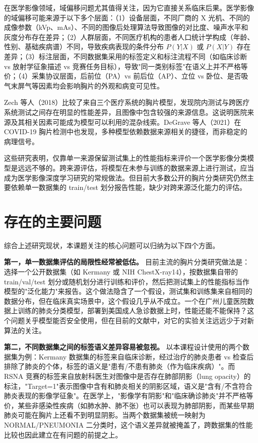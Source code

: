 \documentclass[12pt,a4paper,UTF8,openany]{ctexbook}
\begin{document}
在医学影像领域，域偏移问题尤其值得关注，因为它直接关系临床后果。医学影像的域偏移可能来源于以下多个层面：（1）设备层面，不同厂商的 X 光机、不同的成像参数（kVp、mAs）、不同的图像后处理算法导致图像的对比度、噪声水平和灰度分布存在差异；（2）人群层面，不同医疗机构的患者人口统计学构成（年龄、性别、基础疾病谱）不同，导致疾病表现的条件分布 $P(Y|X)$ 或 $P(X|Y)$ 存在差异；（3）标注层面，不同数据集采用的标签定义和标注流程不同（如临床诊断 vs 放射学征象描述 vs 竞赛任务目标），导致"同一类别标签"在语义上并不严格等价；（4）采集协议层面，后前位（PA）vs 前后位（AP）、立位 vs 卧位、是否吸气末屏气等因素均会影响胸片的外观和病变可见性。

Zech 等人（2018）比较了来自三个医疗系统的胸片模型，发现院内测试与跨医疗系统测试之间存在明显的性能差异，且图像中包含较强的来源信息\cite{zech2018}。这说明医院来源及其相关因素可能成为模型可以利用的混杂线索。DeGrave 等人（2021）在 COVID-19 胸片检测中也发现，多种模型依赖数据来源相关的捷径，而非稳定的病理信号\cite{degrave2021}。

这些研究表明，仅靠单一来源保留测试集上的性能指标来评价一个医学影像分类模型是远远不够的。跨来源评估，将模型在未参与训练的数据来源上进行测试，应当成为医学影像深度学习研究的常规做法。但目前大多数公开的胸片分类研究仍然主要依赖单一数据集的 train/test 划分报告性能，缺少对跨来源泛化能力的评估。

\section{存在的主要问题}

综合上述研究现状，本课题关注的核心问题可以归纳为以下四个方面。

\textbf{第一，单一数据集评估的局限性经常被低估。} 目前主流的胸片分类研究做法是：选择一个公开数据集（如 Kermany 或 NIH ChestX-ray14），按数据集自带的 train/val/test 划分或随机划分进行训练和评价，然后把测试集上的性能指标当作模型的"泛化能力"来报告。这个做法隐含了一个假设，测试集和训练集来自相同的数据分布，但在临床真实场景中，这个假设几乎从不成立。一个在广州儿童医院数据上训练的肺炎分类模型，部署到美国成人急诊数据上时，性能还能不能保持？这个问题关乎模型能否安全使用，但在目前的文献中，对它的实验关注远远少于对新算法的关注。

\textbf{第二，不同数据集之间的标签语义差异容易被忽视。} 以本课程设计使用的两个数据集为例：Kermany 数据集的标签来自临床诊断，经过治疗的肺炎患者 vs 检查后排除了肺炎的个体，标签的语义是"患有/不患有肺炎（作为临床疾病）"。而 RSNA 竞赛的标签来自放射科医生对图像中是否存在肺部阴影（lung opacity）的标注\cite{rsna2018}，"Target=1"表示图像中含有和肺炎相关的阴影区域，语义是"含有/不含符合肺炎表现的影像学征象"。在医学上，"影像学有阴影"和"临床确诊肺炎"并不严格等价，某些非感染性疾病（如肺水肿、肺不张）也可以表现为肺部阴影，而某些早期肺炎可能在胸片上还看不到明显阴影。当两个数据集被统一映射为 NORMAL/PNEUMONIA 二分类时，这个语义差异就被掩盖了，跨数据集的性能比较也因此建立在有问题的前提之上。
\end{document}
